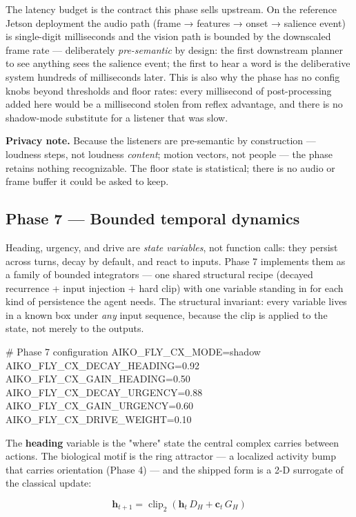 \documentclass[11pt]{article}
\begin{document}
The latency budget is the contract this phase sells upstream. On the reference Jetson deployment the audio path (frame → features → onset → salience event) is single-digit milliseconds and the vision path is bounded by the downscaled frame rate — deliberately \emph{pre-semantic} by design: the first downstream planner to see anything sees the salience event; the first to hear a word is the deliberative system hundreds of milliseconds later. This is also why the phase has no config knobs beyond thresholds and floor rates: every millisecond of post-processing added here would be a millisecond stolen from reflex advantage, and there is no shadow-mode substitute for a listener that was slow.

\textbf{Privacy note.} Because the listeners are pre-semantic by construction — loudness steps, not loudness \emph{content}; motion vectors, not people — the phase retains nothing recognizable. The floor state is statistical; there is no audio or frame buffer it could be asked to keep.

\subsection{Phase 7 — Bounded temporal dynamics}

Heading, urgency, and drive are \emph{state variables}, not function calls: they persist across turns, decay by default, and react to inputs. Phase 7 implements them as a family of bounded integrators — one shared structural recipe (decayed recurrence + input injection + hard clip) with one variable standing in for each kind of persistence the agent needs. The structural invariant: every variable lives in a known box under \emph{any} input sequence, because the clip is applied to the state, not merely to the outputs.

\begin{CodeBlock}
# Phase 7 configuration
AIKO_FLY_CX_MODE=shadow
AIKO_FLY_CX_DECAY_HEADING=0.92
AIKO_FLY_CX_GAIN_HEADING=0.50
AIKO_FLY_CX_DECAY_URGENCY=0.88
AIKO_FLY_CX_GAIN_URGENCY=0.60
AIKO_FLY_CX_DRIVE_WEIGHT=0.10
\end{CodeBlock}

The \textbf{heading} variable is the "where" state the central complex carries between actions. The biological motif is the ring attractor — a localized activity bump that carries orientation (Phase 4) — and the shipped form is a 2-D surrogate of the classical update:

\begin{equation}
\mathbf{h}_{t+1} = \operatorname{clip}_2\!\left(\mathbf{h}_t\,D_H + \mathbf{c}_t\,G_H\right)
\tag{4}
\end{equation}
\end{document}
